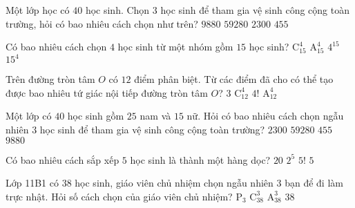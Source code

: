 \begin{ex}%
	Một lớp học có $40$ học sinh. Chọn $3$ học sinh để tham gia vệ sinh công cộng toàn trường, hỏi có bao nhiêu cách chọn như trên?
	\choice
	{\True $ 9880$}
	{$ 59280$}
	{$ 2300$}
	{$ 455$}
\end{ex}


\begin{ex}%
	Có bao nhiêu cách chọn $4$ học sinh từ một nhóm gồm $15$ học sinh?
	\choice
	{\True $\mathrm{C}_{15}^4$}
	{$\mathrm{A}_{15}^4$}
	{$4^{15}$}
	{$15^4$}
\end{ex}
\begin{ex}%
	Trên đường tròn tâm $O$ có $12$ điểm phân biệt. Từ các điểm đã cho có thể tạo được bao nhiêu tứ giác nội tiếp đường tròn tâm $O$?
	\choice
	{3}
	{\True $\mathrm{C}_{12}^4$}
	{$4!$}
	{$\mathrm{A}_{12}^4$}
\end{ex}

\begin{ex}%
	Một lớp có $40$ học sinh gồm $25$ nam và $15$ nữ. Hỏi có bao nhiêu cách chọn ngẫu nhiên $3$ học sinh để tham gia vệ sinh công cộng toàn trường?
	\choice
	{$2300$}
	{$59280$}
	{$455$}
	{\True $9880$}
\end{ex}

\begin{ex}%
	Có bao nhiêu cách sắp xếp $5$ học sinh là thành một hàng dọc?
	\choice
	{$20$}
	{$2^5$}
	{\True $5!$}
	{$5$}
\end{ex}


\begin{ex}%
	Lớp 11B1 có $38$ học sinh, giáo viên chủ nhiệm chọn ngẫu nhiên $3$ bạn để đi làm trực nhật. Hỏi số cách chọn của giáo viên chủ nhiệm?
	\choice
	{$\mathrm{P}_3$}
	{\True $\mathrm{C}_{38}^3$}
	{$\mathrm{A}_{38}^3$}
	{$38$}
\end{ex}

